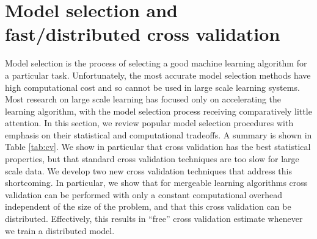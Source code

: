 \documentclass[thesis.tex]{subfiles}
\begin{document}

\section{Model selection and fast/distributed cross validation}
\label{sec:cv}

Model selection is the process of selecting a good machine learning algorithm for a particular task.
Unfortunately, the most accurate model selection methods have high computational cost and so cannot be used in large scale learning systems.
Most research on large scale learning has focused only on accelerating the learning algorithm,
with the model selection process receiving comparatively little attention.
In this section, we review popular model selection procedures with emphasis on their statistical and computational tradeoffs.
A summary is shown in Table \ref{tab:cv}.
We show in particular that cross validation has the best statistical properties,
but that standard cross validation techniques are too slow for large scale data.
We develop two new cross validation techniques that address this shortcoming.
In particular, we show that for mergeable learning algorithms
cross validation can be performed with only a constant computational overhead independent of the size of the problem,
and that this cross validation can be distributed.
Effectively, this results in ``free'' cross validation estimate whenever we train a distributed model.
\end{document}
